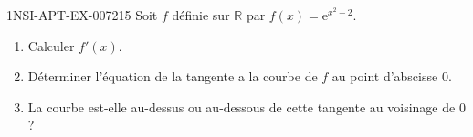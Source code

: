 \begin{exercice}{1NSI-APT-EX-007}{2}{15}
Soit $f$ définie sur $\mathbb{R}$ par $f(x) = \mathrm{e}^{x^2 - 2}$.
\begin{enumerate}
  \item Calculer $f'(x)$.
  \item Déterminer l'équation de la tangente a la courbe de $f$ au point d'abscisse $0$.
  \item La courbe est-elle au-dessus ou au-dessous de cette tangente au voisinage de $0$ ?
\end{enumerate}

\end{exercice}
